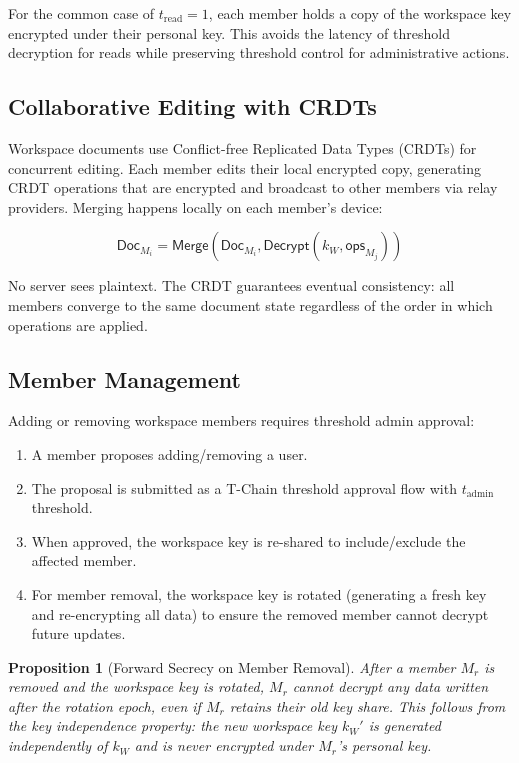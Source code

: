 \documentclass[11pt,a4paper]{article}
\newtheorem{proposition}[theorem]{Proposition}
\begin{document}
For the common case of $t_{\text{read}} = 1$, each member holds a copy of
the workspace key encrypted under their personal key. This avoids the
latency of threshold decryption for reads while preserving threshold
control for administrative actions.

\subsection{Collaborative Editing with CRDTs}

Workspace documents use Conflict-free Replicated Data Types (CRDTs)
\cite{shapiro2011crdt} for concurrent editing. Each member edits their
local encrypted copy, generating CRDT operations that are encrypted and
broadcast to other members via relay providers. Merging happens locally
on each member's device:

\begin{equation}
    \mathsf{Doc}_{M_i} = \mathsf{Merge}(\mathsf{Doc}_{M_i}, \mathsf{Decrypt}(k_W, \mathsf{ops}_{M_j}))
\end{equation}

No server sees plaintext. The CRDT guarantees eventual consistency:
all members converge to the same document state regardless of the
order in which operations are applied.

\subsection{Member Management}

Adding or removing workspace members requires threshold admin approval:

\begin{enumerate}
    \item A member proposes adding/removing a user.
    \item The proposal is submitted as a T-Chain threshold approval flow
    with $t_{\text{admin}}$ threshold.
    \item When approved, the workspace key is re-shared to include/exclude
    the affected member.
    \item For member removal, the workspace key is rotated (generating a
    fresh key and re-encrypting all data) to ensure the removed member
    cannot decrypt future updates.
\end{enumerate}

\begin{proposition}[Forward Secrecy on Member Removal]
After a member $M_r$ is removed and the workspace key is rotated, $M_r$
cannot decrypt any data written after the rotation epoch, even if $M_r$
retains their old key share. This follows from the key independence
property: the new workspace key $k_W'$ is generated independently of
$k_W$ and is never encrypted under $M_r$'s personal key.
\end{proposition}
\end{document}
